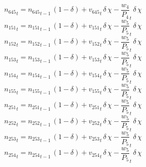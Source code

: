 \begin{dmath}
{{n_{645}}}_{t}={{n_{645}}}_{t-1}\, \left(1-{{\delta}}\right)+{{v_{645}}}_{t}\, {{\delta}}\, {{\chi}}-{{\frac{w_{4}}{P_{4}}}}_{t}\, {{\delta}}\, {{\chi}}
\end{dmath}
\begin{dmath}
{{n_{151}}}_{t}={{n_{151}}}_{t-1}\, \left(1-{{\delta}}\right)+{{v_{151}}}_{t}\, {{\delta}}\, {{\chi}}-{{\frac{w_{5}}{P_{5}}}}_{t}\, {{\delta}}\, {{\chi}}
\end{dmath}
\begin{dmath}
{{n_{152}}}_{t}={{n_{152}}}_{t-1}\, \left(1-{{\delta}}\right)+{{v_{152}}}_{t}\, {{\delta}}\, {{\chi}}-{{\frac{w_{5}}{P_{5}}}}_{t}\, {{\delta}}\, {{\chi}}
\end{dmath}
\begin{dmath}
{{n_{153}}}_{t}={{n_{153}}}_{t-1}\, \left(1-{{\delta}}\right)+{{v_{153}}}_{t}\, {{\delta}}\, {{\chi}}-{{\frac{w_{5}}{P_{5}}}}_{t}\, {{\delta}}\, {{\chi}}
\end{dmath}
\begin{dmath}
{{n_{154}}}_{t}={{n_{154}}}_{t-1}\, \left(1-{{\delta}}\right)+{{v_{154}}}_{t}\, {{\delta}}\, {{\chi}}-{{\frac{w_{5}}{P_{5}}}}_{t}\, {{\delta}}\, {{\chi}}
\end{dmath}
\begin{dmath}
{{n_{155}}}_{t}={{n_{155}}}_{t-1}\, \left(1-{{\delta}}\right)+{{v_{155}}}_{t}\, {{\delta}}\, {{\chi}}-{{\frac{w_{5}}{P_{5}}}}_{t}\, {{\delta}}\, {{\chi}}
\end{dmath}
\begin{dmath}
{{n_{251}}}_{t}={{n_{251}}}_{t-1}\, \left(1-{{\delta}}\right)+{{v_{251}}}_{t}\, {{\delta}}\, {{\chi}}-{{\frac{w_{5}}{P_{5}}}}_{t}\, {{\delta}}\, {{\chi}}
\end{dmath}
\begin{dmath}
{{n_{252}}}_{t}={{n_{252}}}_{t-1}\, \left(1-{{\delta}}\right)+{{v_{252}}}_{t}\, {{\delta}}\, {{\chi}}-{{\frac{w_{5}}{P_{5}}}}_{t}\, {{\delta}}\, {{\chi}}
\end{dmath}
\begin{dmath}
{{n_{253}}}_{t}={{n_{253}}}_{t-1}\, \left(1-{{\delta}}\right)+{{v_{253}}}_{t}\, {{\delta}}\, {{\chi}}-{{\frac{w_{5}}{P_{5}}}}_{t}\, {{\delta}}\, {{\chi}}
\end{dmath}
\begin{dmath}
{{n_{254}}}_{t}={{n_{254}}}_{t-1}\, \left(1-{{\delta}}\right)+{{v_{254}}}_{t}\, {{\delta}}\, {{\chi}}-{{\frac{w_{5}}{P_{5}}}}_{t}\, {{\delta}}\, {{\chi}}
\end{dmath}
